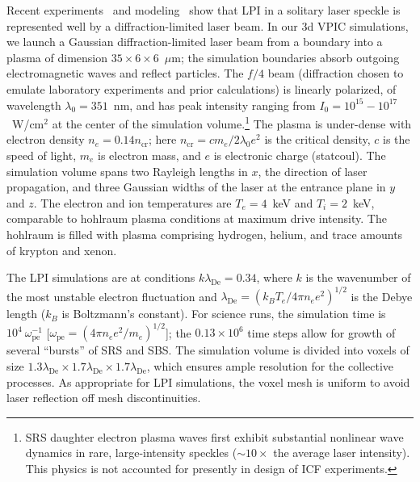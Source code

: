 \documentclass[journal,twoside]{IEEEtran}
\newcommand{\lde}      {\lambda_{\mathrm{De}}}
\newcommand{\wpe}      {\omega_{\mathrm{pe}}}
\begin{document}
Recent experiments~\cite{Kline_PRL_2005} and
modeling~\cite{Yin_et_al_PRL_2007_SRS} show that LPI in a solitary
laser speckle is represented well by a diffraction-limited laser beam.
In our 3d VPIC simulations, we launch a Gaussian diffraction-limited
laser beam from a boundary into a plasma of dimension $35 \times 6
\times 6$~$\mu$m; the simulation boundaries absorb outgoing
electromagnetic waves and reflect particles.  The $f/4$ beam
(diffraction chosen to emulate laboratory experiments and prior
calculations) is linearly polarized, of wavelength $\lambda_0 =
351$~nm, and has peak intensity ranging from $I_0 = 10^{15} -
10^{17}$~W/cm$^2$ at the center of the simulation 
volume.\footnote{
SRS daughter electron plasma waves first exhibit substantial nonlinear
wave dynamics in rare, large-intensity speckles ($\sim 10\times$
the average laser intensity).  This physics is not accounted for 
presently in design of ICF experiments.}
The plasma is under-dense with electron density $n_e = 0.14
n_{\mathrm{cr}}$; here $n_{\mathrm{cr}} = c m_e / 2 \lambda_0 e^2$ is
the critical density, $c$ is the speed of light, $m_e$ is electron
mass, and $e$ is electronic charge (statcoul).  The simulation volume
spans two Rayleigh lengths in $x$, the direction of laser propagation,
and three Gaussian widths of the laser at the entrance plane in $y$
and $z$.  The electron and ion temperatures are $T_e = 4$~keV and $T_i
= 2$~keV, comparable to hohlraum plasma conditions at maximum drive
intensity.  The hohlraum is filled with plasma comprising hydrogen,
helium, and trace amounts of krypton and xenon.

The LPI simulations are at conditions $k \lde = 0.34$, where $k$ is
the wavenumber of the most unstable electron fluctuation and $\lde =
(k_B T_e / 4 \pi n_e e^2)^{1/2}$ is the Debye length ($k_B$ is
Boltzmann's constant).  For science runs, the simulation time 
is $10^4~\wpe^{-1}$ 
[$\wpe = (4 \pi n_e e^2 / m_e)^{1/2}$]; the $0.13 \times 10^6$ time steps
allow for growth of several ``bursts'' of SRS and SBS.  The simulation
volume is divided into voxels of size $1.3\lde \times 1.7\lde \times
1.7\lde$, which ensures ample resolution for the collective processes.
As appropriate for LPI simulations, the voxel mesh is uniform to avoid
laser reflection off mesh discontinuities.
\end{document}
